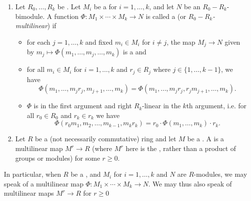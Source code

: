 \begin{definition} \label{definition:multilinear_map_of_modules_over_rings}
    \begin{enumerate}
        \item 
        Let $R_0,\ldots,R_k$ be . Let $M_i$ be a  for $i = 1,\ldots,k$, and let $N$ be an $R_0-R_k$-bimodule. A function $\Phi: M_1 \times \cdots \times M_k \to N$ is called a  (or \emph{$R_0-R_k$-multilinear}) if \label{item:multilinear_map_of_modules_over_rings_distinct}
        \begin{itemize}
            \item for each $j=1,\ldots,k$ and fixed $m_i \in M_i$ for $i \neq j$, the map $M_j \to N$ given by $m_j \mapsto \Phi(m_1,\ldots,m_j,\ldots,m_k)$ is a  and
            \item for all $m_i \in M_i$ for $i = 1,\ldots, k$ and $r_j \in R_j$ where $j \in \{1,\ldots,k-1\}$, we have 
            $$\Phi(m_1,\ldots,m_j r_j, m_{j+1}, \ldots,m_k) = \Phi(m_1,\ldots,m_j r_j, r_j m_{j+1},\ldots,m_k).$$
            \item $\Phi$ is  in the first argument and right $R_k$-linear in the $k$th argument, i.e. for all $r_0 \in R_0$ and $r_k \in r_k$ we have
            $$\Phi(r_0m_1,m_2,\ldots,m_{k-1}, m_kr_k) = r_0 \cdot \Phi(m_1,\ldots,m_k) \cdot r_k.$$
        \end{itemize}

        \item Let $R$ be a (not necessarily commutative) ring and let $M$ be a . A  is a multilinear map $M^r \to R$ (where $M^r$ here is the , rather than a product of groups or modules) for some $r \geq 0$. 

    \end{enumerate}

    In particular, when $R$ be a , and $M_i$ for $i = 1,\ldots,k$ and $N$ are $R$-modules, we may speak of a multilinear map $\Phi: M_1 \times \cdots \times M_k \to N$. We may thus also speak of multilinear maps $M^r \to R$ for $r \geq 0$


\end{definition}
